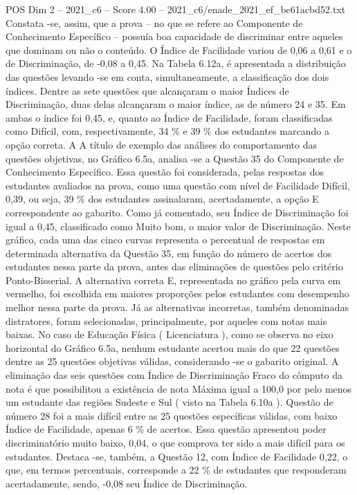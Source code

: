 \begin{textsample}{POS Dim 2 – 2021\_c6 – Score 4.00 – 2021\_c6/enade\_2021\_ef\_be61acbd52.txt}
Constata -se, assim, que a prova – no que se refere ao Componente de Conhecimento Específico – possuía boa capacidade de discriminar entre aqueles que dominam ou não o conteúdo.
O Índice de Facilidade variou de 0,06 a 0,61 e o de Discriminação, de -0,08 a 0,45.
Na Tabela 6.12a, é apresentada a distribuição das questões levando -se em conta, simultaneamente, a classificação dos dois índices.
Dentre as sete questões que alcançaram o maior Índices de Discriminação, duas delas alcançaram o maior índice, as de número 24 e 35.
Em ambas o índice foi 0,45, e, quanto ao Índice de Facilidade, foram classificadas como Difícil, com, respectivamente, 34 \% e 39 \% dos estudantes marcando a opção correta.
A A título de exemplo das análises do comportamento das questões objetivas, no Gráfico 6.5a, analisa -se a Questão 35 do Componente de Conhecimento Específico.
Essa questão foi considerada, pelas respostas dos estudantes avaliados na prova, como uma questão com nível de Facilidade Difícil, 0,39, ou seja, 39 \% dos estudantes assinalaram, acertadamente, a opção E correspondente ao gabarito.
Como já comentado, seu Índice de Discriminação foi igual a 0,45, classificado como Muito bom, o maior valor de Discriminação.
Neste gráfico, cada uma das cinco curvas representa o percentual de respostas em determinada alternativa da Questão 35, em função do número de acertos dos estudantes nessa parte da prova, antes das eliminações de questões pelo critério Ponto-Bisserial.
A alternativa correta E, representada no gráfico pela curva em vermelho, foi escolhida em maiores proporções pelos estudantes com desempenho melhor nessa parte da prova.
Já as alternativas incorretas, também denominadas distratores, foram selecionadas, principalmente, por aqueles com notas mais baixas.
No caso de Educação Física ( Licenciatura ), como se observa no eixo horizontal do Gráfico 6.5a, nenhum estudante acertou mais do que 22 questões dentre as 25 questões objetivas válidas, considerando -se o gabarito original.
A eliminação das seis questões com Índice de Discriminação Fraco do cômputo da nota é que possibilitou a existência de nota Máxima igual a 100,0 por pelo menos um estudante das regiões Sudeste e Sul ( visto na Tabela 6.10a ).
Questão de número 28 foi a mais difícil entre as 25 questões específicas válidas, com baixo Índice de Facilidade, apenas 6 \% de acertos.
Essa questão apresentou poder discriminatório muito baixo, 0,04, o que comprova ter sido a mais difícil para os estudantes.
Destaca -se, também, a Questão 12, com Índice de Facilidade 0,22, o que, em termos percentuais, corresponde a 22 \% de estudantes que responderam acertadamente, sendo, -0,08 seu Índice de Discriminação.

\end{textsample}
